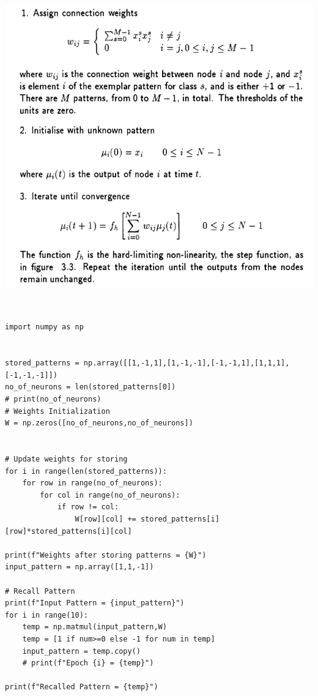 \documentclass{article}
\begin{document}
    \subsection{}
	\begin{center}
	\includegraphics{Capture.PNG}
	\end{center}



    	 
    \vspace{0.5cm}
    

    \subsection{}

    \begin{verbatim}

import numpy as np


stored_patterns = np.array([[1,-1,1],[1,-1,-1],[-1,-1,1],[1,1,1],[-1,-1,-1]])
no_of_neurons = len(stored_patterns[0])
# print(no_of_neurons)
# Weights Initialization
W = np.zeros([no_of_neurons,no_of_neurons])


# Update weights for storing
for i in range(len(stored_patterns)):
    for row in range(no_of_neurons):
        for col in range(no_of_neurons):
            if row != col:
                W[row][col] += stored_patterns[i][row]*stored_patterns[i][col]

print(f"Weights after storing patterns = {W}")
input_pattern = np.array([1,1,-1])

# Recall Pattern
print(f"Input Pattern = {input_pattern}")
for i in range(10):
    temp = np.matmul(input_pattern,W)
    temp = [1 if num>=0 else -1 for num in temp]
    input_pattern = temp.copy()
    # print(f"Epoch {i} = {temp}")

print(f"Recalled Pattern = {temp}")

    
    \end{verbatim}
\end{document}
